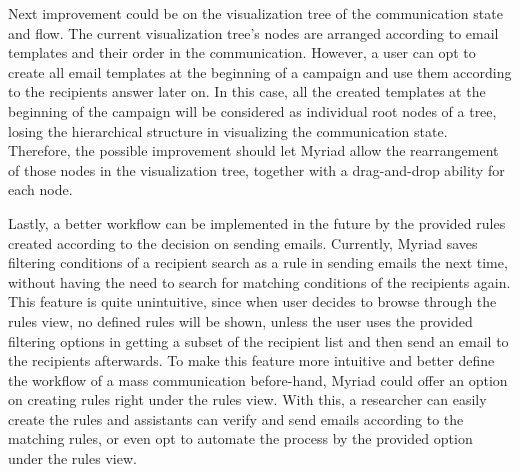 Next improvement could be on the visualization tree of the communication state and flow. The current visualization tree's nodes are arranged according to email templates and their order in the communication. However, a user can opt to create all email templates at the beginning of a campaign and use them according to the recipients answer later on. In this case, all the created templates at the beginning of the campaign will be considered as individual root nodes of a tree, losing the hierarchical structure in visualizing the communication state. Therefore, the possible improvement should let Myriad allow the rearrangement of those nodes in the visualization tree, together with a drag-and-drop ability for each node.
\vspace{1cm}

Lastly, a better workflow can be implemented in the future by the provided rules created according to the decision on sending emails. Currently, Myriad saves filtering conditions of a recipient search as a rule in sending emails the next time, without having the need to search for matching conditions of the recipients again. This feature is quite unintuitive, since when user decides to browse through the rules view, no defined rules will be shown, unless the user uses the provided filtering options in getting a subset of the recipient list and then send an email to the recipients afterwards. To make this feature more intuitive and better define the workflow of a mass communication before-hand, Myriad could offer an option on creating rules right under the rules view. With this, a researcher can easily create the rules and assistants can verify and send emails according to the matching rules, or even opt to automate the process by the provided option under the rules view.

 